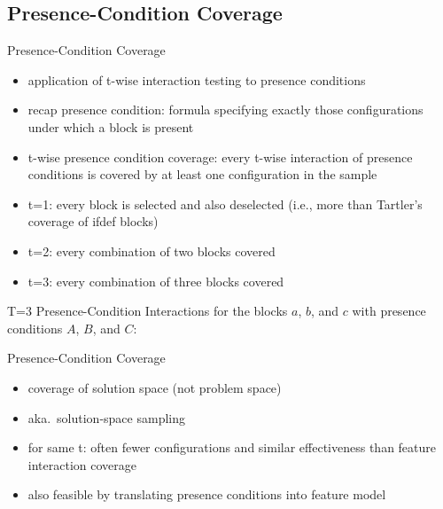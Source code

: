 \subsection{Presence-Condition Coverage}
\begin{frame}{\myframetitle}
	\begin{mycolumns}[widths={48}]
		\begin{definition}{Presence-Condition Coverage\mysource{\krieterpresenceconditioncoverage}}
			\begin{itemize}
				\item application of t-wise interaction testing to presence conditions
				\item recap presence condition: formula specifying exactly those configurations under which a block is present
				\item t-wise presence condition coverage: every t-wise interaction of presence conditions is covered by at least one configuration in the sample
				\item t=1: every block is selected and also deselected (i.e., more than Tartler's coverage of ifdef blocks)
				\item t=2: every combination of two blocks covered
				\item t=3: every combination of three blocks covered
			\end{itemize}
		\end{definition}
	\mynextcolumn
		\pause
		\begin{example}{{T=3 Presence-Condition Interactions}}
			for the blocks $a$, $b$, and $c$ with presence conditions $A$, $B$, and $C$:

		\end{example}
		\pause
		\begin{note}{Presence-Condition Coverage\mysource{\krieterpresenceconditioncoverage}}
			\begin{itemize}
				\item coverage of solution space (not problem space)
				\item aka.\ solution-space sampling
				\item for same t: often fewer configurations and similar effectiveness than feature interaction coverage
				\item also feasible by translating presence conditions into feature model \mysource{\hentzesolutionspacesampling}
			\end{itemize}
		\end{note}
	\end{mycolumns}
\end{frame}

